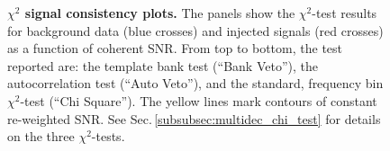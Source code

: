 \documentclass[binding=0.6cm, LaM]{sapthesis}
\begin{document}
        \begin{figure}[!t]
          \noindent
          \label{signalconsistencyplots1}
          \centering
          \caption{\textbf{$\chi^2$ signal consistency plots.} The panels show the $\chi^2$-test results for background data (blue crosses) and injected signals (red crosses) as a function of coherent SNR.  From top to bottom, the test reported are: the template bank test (``Bank Veto''), the autocorrelation test (``Auto Veto''), and the standard, frequency bin $\chi^2$-test (``Chi Square'').  The yellow lines mark contours of constant re-weighted SNR. See Sec.\,\ref{subsubsec:multidec_chi_test} for details on the three $\chi^2$-tests.}
          \label{fig:signalconsistencyplots1}
       	\end{figure}
\end{document}
